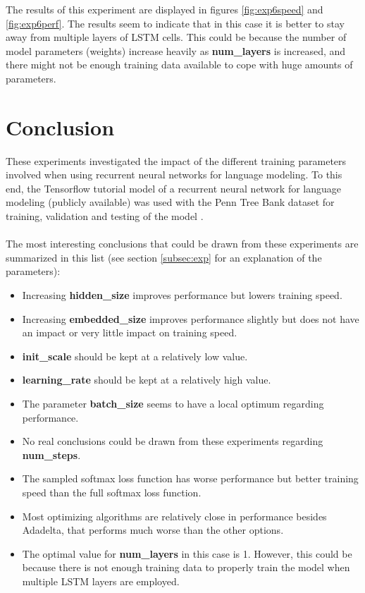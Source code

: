 \documentclass[10pt,a4paper,titlepage]{article}
\begin{document}
The results of this experiment are displayed in figures \ref{fig:exp6speed} and \ref{fig:exp6perf}. The results seem to indicate that in this case it is better to stay away from multiple layers of LSTM cells. This could be because the number of model parameters (weights) increase heavily as \textbf{num\_layers} is increased, and there might not be enough training data available to cope with huge amounts of parameters.

\newpage
\section{Conclusion}

These experiments investigated the impact of the different training parameters involved when using recurrent neural networks for language modeling. To this end, the Tensorflow tutorial model of a recurrent neural network for language modeling (publicly available) was used with the Penn Tree Bank dataset for training, validation and testing of the model \cite{tensorflow}.\\
\\
The most interesting conclusions that could be drawn from these experiments are summarized in this list (see section \ref{subsec:exp} for an explanation of the parameters):

\begin{itemize}
	\item Increasing \textbf{hidden\_size} improves performance but lowers training speed.
	\item Increasing \textbf{embedded\_size} improves performance slightly but does not have an impact or very little impact on training speed.
	\item \textbf{init\_scale} should be kept at a relatively low value.	
	\item \textbf{learning\_rate} should be kept at a relatively high value.
	\item The parameter \textbf{batch\_size} seems to have a local optimum regarding performance.
	\item No real conclusions could be drawn from these experiments regarding \textbf{num\_steps}. 
	\item The sampled softmax loss function has worse performance but better training speed than the full softmax loss function. 
	\item Most optimizing algorithms are relatively close in performance besides Adadelta, that performs much worse than the other options.
	\item The optimal value for \textbf{num\_layers} in this case is 1. However, this could be because there is not enough training data to properly train the model when multiple LSTM layers are employed.
\end{itemize}
\end{document}
